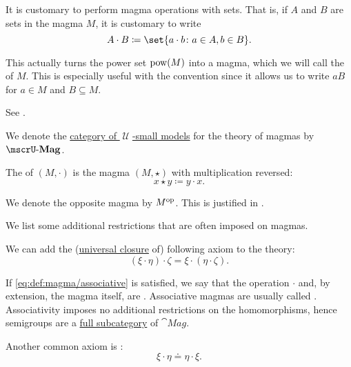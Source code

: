 \begin{definition}
\begin{thmenum}[series=def:magma]
     It is customary to perform magma operations with sets. That is, if \( A \) and \( B \) are sets in the magma \( M \), it is customary to write
    \begin{equation*}
      A \cdot B \coloneqq \set{ a \cdot b \colon a \in A, b \in B }.
    \end{equation*}

    This actually turns the power set \( \operatorname{pow}(M) \) into a magma, which we will call the  of \( M \). This is especially useful with the convention  since it allows us to write \( aB \) for \( a \in M \) and \( B \subseteq M \).

    See .

     We denote the \hyperref[def:category_of_small_first_order_models]{category of \( \mscrU \)-small models} for the theory of magmas by \( \ucat{Mag} \).

     The  of \( (M, \cdot) \) is the magma \( (M, \star) \) with multiplication reversed:
    \begin{equation*}
      x \star y \coloneqq y \cdot x.
    \end{equation*}

    We denote the opposite magma by \( M^{\operatorname{op}} \). This is justified in .
  \end{thmenum}

  We list some additional restrictions that are often imposed on magmas.
  \begin{thmenum}[resume=def:magma]
     We can add the (\hyperref[thm:implicit_universal_quantification]{universal closure} of) following axiom to the theory:
    \begin{equation}\label{eq:def:magma/associative}
      (\xi \cdot \eta) \cdot \zeta = \xi \cdot (\eta \cdot \zeta).
    \end{equation}

    If \eqref{eq:def:magma/associative} is satisfied, we say that the operation \( \cdot \) and, by extension, the magma itself, are . Associative magmas are usually called . Associativity imposes no additional restrictions on the homomorphisms, hence semigroups are a \hyperref[def:subcategory]{full subcategory} of \( \cat{Mag} \).

     Another common axiom is :
    \begin{equation}\label{eq:def:magma/commutative}
      \xi \cdot \eta \doteq \eta \cdot \xi.
    \end{equation}


\end{thmenum}
\end{definition}
